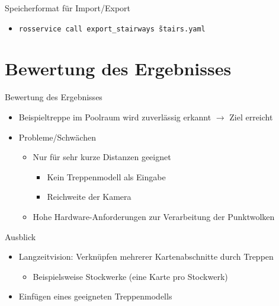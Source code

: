 \documentclass[18pt]{beamer}
\begin{document}
\begin{frame}{Speicherformat für Import/Export}
	\begin{itemize}
		\item \texttt{rosservice call export\_stairways \~stairs.yaml}
	\end{itemize}

\end{frame}



\section{Bewertung des Ergebnisses}

\begin{frame}{Bewertung des Ergebnisses}
\begin{itemize}
	\item Beispieltreppe im Poolraum wird zuverlässig erkannt \(\longrightarrow\) Ziel erreicht
	\item Probleme/Schwächen
	\begin{itemize}
		\item Nur für sehr kurze Distanzen geeignet
		\begin{itemize}
			\item Kein Treppenmodell als Eingabe
			\item Reichweite der Kamera
		\end{itemize}
		\item Hohe Hardware-Anforderungen zur Verarbeitung der Punktwolken
	\end{itemize}
\end{itemize}
\end{frame}

\begin{frame}{Ausblick}
\begin{itemize}
	\item Langzeitvision: Verknüpfen mehrerer Kartenabschnitte durch Treppen
	\begin{itemize}
		\item Beispielsweise Stockwerke (eine Karte pro Stockwerk)
	\end{itemize}
	\item Einfügen eines geeigneten Treppenmodells
\end{itemize}
\end{frame}
\end{document}
